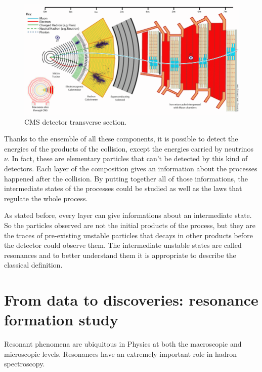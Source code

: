 \begin{figure}[t]
	\begin{center}
		\includegraphics[width=1.0\textwidth]{Images/LHC/cms_transverse_section.png}
		\caption{CMS detector transverse section.}
		\label{fig:CMS_TRANSVERSE_SECTION}
	\end{center}
\end{figure}

Thanks to the ensemble of all these components, it is possible to detect the energies of the products of the collision, except the energies carried by neutrinos $\nu$. In fact, these are elementary particles that can't be detected by this kind of detectors. Each layer of the composition gives an information about the processes happened after the collision. By putting together all of those informations, the intermediate states of the processes could be studied as well as the laws that regulate the whole process.

As stated before, every layer can give informations about an intermediate state. So the particles observed are not the initial products of the process, but they are the traces of pre-existing unstable particles that decays in other products before the detector could observe them. The intermediate unstable states are called resonances and to better understand them it is appropriate to describe the classical definition.





\section{From data to discoveries: resonance formation study}
Resonant phenomena are ubiquitous in Physics at both the macroscopic and microscopic levels. Resonances have an extremely important role in hadron spectroscopy.

